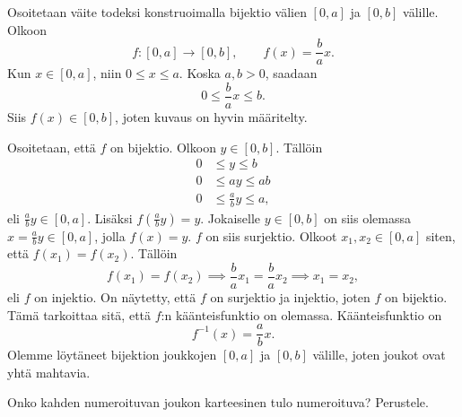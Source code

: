 \documentclass[11pt,a4paper]{amsart}
\begin{document}
\begin{solution}
Osoitetaan väite todeksi konstruoimalla bijektio välien
\([0, a]\) ja \([0, b]\) välille. Olkoon
\[
f \colon [0, a] \to [0, b], \qquad f(x) = \frac{b}{a}x.
\]
Kun \(x \in [0, a]\), niin \(0 \leq x \leq a\). Koska \(a, b > 0\), saadaan
\[
0 \leq \frac{b}{a}x \leq b.
\]
Siis \(f(x) \in [0, b]\), joten kuvaus on hyvin määritelty.

Osoitetaan, että \(f\) on bijektio. Olkoon \(y \in [0, b]\). Tällöin
\[
\begin{aligned}
0 &\leq y \leq b \\
0 &\leq ay \leq ab \\
0 &\leq \frac{a}{b}y \leq a,
\end{aligned}
\]
eli \(\frac{a}{b}y \in [0, a]\). Lisäksi \(f(\frac{a}{b}y) = y\). Jokaiselle
\(y \in [0, b]\) on siis olemassa \(x = \frac{a}{b}y \in [0, a]\), jolla
\(f(x) = y\). \(f\) on siis surjektio. Olkoot \(x_1, x_2 \in [0, a]\) siten,
että \(f(x_1) = f(x_2)\). Tällöin
\[
f(x_1) = f(x_2) \implies \frac{b}{a}x_1 = \frac{b}{a}x_2 \implies x_1 = x_2,
\]
eli \(f\) on injektio. On näytetty, että \(f\) on surjektio ja injektio, joten
\(f\) on bijektio. Tämä tarkoittaa sitä, että \(f\):n käänteisfunktio
on olemassa.
Käänteisfunktio on
\[
f^{-1}(x) = \frac{a}{b}x.
\]
Olemme löytäneet bijektion joukkojen \([0, a]\) ja \([0, b]\) välille, joten
joukot ovat yhtä mahtavia.
\end{solution}

\begin{exercise}
Onko kahden numeroituvan joukon karteesinen tulo numeroituva? Perustele.
\end{exercise}
\end{document}
